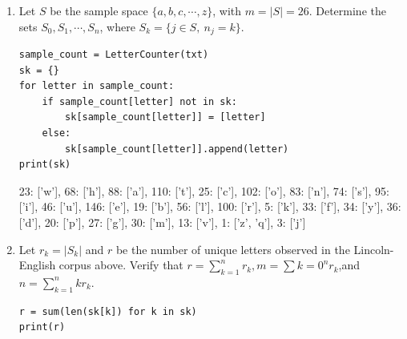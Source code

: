 \documentclass[preprint,12pt]{elsarticle}
\begin{document}
\begin{enumerate}[label=\alph*]
\begin{lstlisting}
english = langReader(path + r'\english.dat')

# Read in lincoln_text.txt
txt = ''
for line in open(path + r'\lincoln_text.txt'):
    txt = txt + line
txt = ''.join(e for e in txt if e.isalnum()).lower()
counter = LetterCounter(txt)
length = len(txt)

# Since there might be some missing letters
lincolnEng = {}
for letter in english:
    if letter not in counter:
        counter[letter] = 0
    lincolnEng[letter] = counter[letter] / length
print(lincolnEng)
        \end{lstlisting}
        As the result, I got my $\hat{\theta}$ to be
        \begin{spverbatim}
{'a': 0.07108239095315025, 'b': 0.015347334410339256, 
'c': 0.020193861066235864, 'd': 0.029079159935379646, 
'e': 0.11793214862681745, 'f': 0.02665589660743134, 
'g': 0.021809369951534735, 'h': 0.05492730210016155, 
'i': 0.07673667205169628, 'j': 0.0024232633279483036, 
'k': 0.004038772213247173, 'l': 0.045234248788368334, 
'm': 0.024232633279483037, 'n': 0.06704361873990307, 
'o': 0.08239095315024232, 'p': 0.01615508885298869, 
'q': 0.0008077544426494346, 'r': 0.08077544426494346, 
's': 0.05977382875605816, 't': 0.0888529886914378, 
'u': 0.03715670436187399, 'v': 0.01050080775444265, 
'w': 0.018578352180936994, 'x': 0.0, 
'y': 0.027463651050080775, 'z': 0.0008077544426494346}
        \end{spverbatim}
        
    \item Let $S$ be the sample space $\{a,b,c,\cdots,z\}$, with $m=|S|=26$. Determine the sets $S_0, S_1,\cdots,S_{n}$,
    where $S_{k} = \{j\in S,\ n_{j}=k\}$.
    \begin{lstlisting}
sample_count = LetterCounter(txt)
sk = {}
for letter in sample_count:
    if sample_count[letter] not in sk:
        sk[sample_count[letter]] = [letter]
    else:
        sk[sample_count[letter]].append(letter)
print(sk)
    \end{lstlisting} 
    \begin{spverbatim}
{23: ['w'], 68: ['h'], 88: ['a'], 110: ['t'], 25: ['c'], 
102: ['o'], 83: ['n'], 74: ['s'], 95: ['i'], 46: ['u'], 
146: ['e'], 19: ['b'], 56: ['l'], 100: ['r'], 5: ['k'], 
33: ['f'], 34: ['y'], 36: ['d'], 20: ['p'], 27: ['g'], 
30: ['m'], 13: ['v'], 1: ['z', 'q'], 3: ['j']}
    \end{spverbatim}
   
    \item Let $r_{k} = |S_{k}|$ and $r$ be the number of unique letters observed
    in the Lincoln-English corpus above. Verify that $r=\sum_{k=1}^n r_k,
    m=\sum{k=0}^n r_{k}$,and $n=\sum_{k=1}^n kr_{k}$.
    \begin{lstlisting}
r = sum(len(sk[k]) for k in sk)
print(r)


\end{lstlisting}
\end{enumerate}
\end{document}
